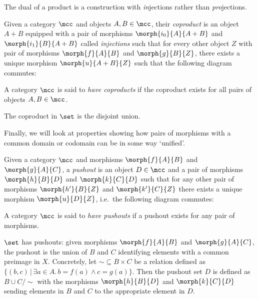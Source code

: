 The dual of a product is a construction with \emph{in}jections rather than
\emph{pro}jections.

\begin{definition}[Coproduct]
    Given a category \(\mcc\) and objects \(A,B \in \mcc\), their \emph{coproduct}
    is an object \(A + B\) equipped with a pair of morphisms
    \(\morph{i_0}{A}{A + B}\) and \(\morph{i_1}{B}{A + B}\) called
    \emph{injections} such that for every other object \(Z\) with pair of
    morphisms \(\morph{f}{A}{B}\) and \(\morph{g}{B}{Z}\), there exists a unique
    morphism \(\morph{u}{A + B}{Z}\) such that the following diagram
    commutes:
    \begin{center}
        
    \end{center}
    A category \(\mcc\) is said to \emph{have coproducts} if the coproduct
    exists for all pairs of objects \(A,B \in \mcc\).
\end{definition}

\begin{example}
    The coproduct in \(\set\) is the disjoint union.
\end{example}

Finally, we will look at properties showing how pairs of morphisms with a
common domain or codomain can be in some way `unified'.

\begin{definition}[Pushout]
    Given a category \(\mcc\) and morphisms
    \(\morph{f}{A}{B}\) and \(\morph{g}{A}{C}\), a
    \emph{pushout} is an object \(D \in \mcc\) and a pair of morphisms
    \(\morph{h}{B}{D}\) and \(\morph{k}{C}{D}\) such that for any other pair of
    morphisms \(\morph{h^\prime}{B}{Z}\) and \(\morph{k^\prime}{C}{Z}\) there
    exists a unique morphism \(\morph{u}{D}{Z}\), i.e.\ the following diagram
    commutes:
    \begin{center}
        
    \end{center}
    A category \(\mcc\) is said to \emph{have pushouts} if a pushout exists for
    any pair of morphisms.
\end{definition}

\begin{example}
    \(\set\) has pushouts: given morphisms \(\morph{f}{A}{B}\) and
    \(\morph{g}{A}{C}\), the pushout is the union of \(B\) and \(C\) identifying
    elements with a common preimage in \(X\).
    Concretely, let \({\sim} \subseteq B \times C\) be a relation defined as
    \(\{(b, c) \,|\, \exists a \in A.\, b = f(a) \wedge c = g(a)\}\).
    Then the pushout set \(D\) is defined as \(B \cup C / \sim\) with the
    morphisms \(\morph{h}{B}{D}\) and \(\morph{k}{C}{D}\) sending elements in
    \(B\) and \(C\) to the appropriate element in \(D\).
\end{example}

